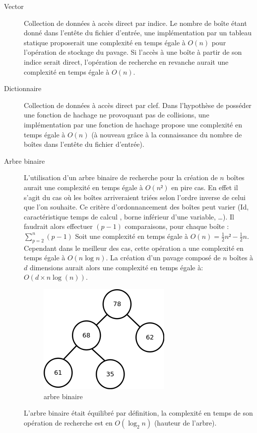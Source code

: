 \begin{description}
 \item[Vector] Collection de données à accès direct par indice. Le nombre de boîte étant donné dans l'entête du fichier d'entrée, une implémentation par un tableau statique proposerait une complexité en temps égale à $O(n)$ pour l'opération de stockage du pavage. Si l'accès à une boîte à partir de son indice serait direct, l'opération de recherche en revanche aurait une complexité en temps égale à $O(n)$. 

\item[Dictionnaire]
Collection de données à accès direct par clef. Dans l'hypothèse de posséder une fonction de hachage ne provoquant pas de collisions, une implémentation par une fonction de hachage propose une complexité en temps égale à $O(n)$ (à nouveau grâce à la connaissance du nombre de boîtes dans l'entête du fichier d'entrée).


\item[Arbre binaire]
L'utilisation d'un arbre binaire de recherche pour la création de $n$ boîtes aurait une complexité en temps égale à $O(n²)$ en pire cas. En effet il s'agit du cas où les boîtes arriveraient triées selon l'ordre inverse de celui que l'on souhaite. Ce critère d'ordonnancement des boîtes peut varier (Id, caractéristique \og temps de calcul \fg{}, borne inférieur d'une variable, \dots{}). Il faudrait alors effectuer $(p-1)$ comparaisons, pour chaque boîte :  $\sum_{p=2}^{n}(p-1)$  Soit une complexité en temps égale à $O(n)=\frac{1}{2}n²-\frac{1}{2}n$. Cependant dans le meilleur des cas, cette opération a une complexité en temps égale à $O(n\log{n})$. La création d'un pavage composé de $n$ boîtes à $d$ dimensions aurait alors une complexité en temps égale à: $O(d \times n\log(n))$.

\begin{figure}[htbp]
  \centering
  \includegraphics[scale=0.60]{img/binTree}
  \caption{arbre binaire}
  \label{fig:ab}
\end{figure}
L'arbre binaire était équilibré par définition, la complexité en temps de son opération de recherche est en $O(\log_2{n})$ (hauteur de l'arbre).
   



\end{description}
